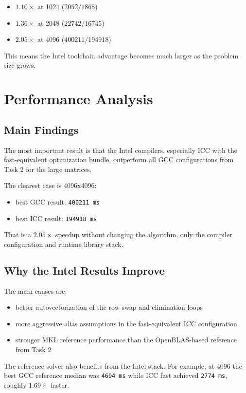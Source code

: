\documentclass[11pt,a4paper]{article}
\begin{document}
\begin{itemize}
\item $1.10\times$ at 1024 ($2052 / 1868$)
\item $1.36\times$ at 2048 ($22742 / 16745$)
\item $2.05\times$ at 4096 ($400211 / 194918$)
\end{itemize}

This means the Intel toolchain advantage becomes much larger as the problem
size grows.

\section{Performance Analysis}

\subsection{Main Findings}

The most important result is that the Intel compilers, especially ICC with the
fast-equivalent optimization bundle, outperform all GCC configurations from
Task 2 for the large matrices.

The clearest case is 4096x4096:

\begin{itemize}
\item best GCC result: \texttt{400211 ms}
\item best ICC result: \texttt{194918 ms}
\end{itemize}

That is a $2.05\times$ speedup without changing the algorithm, only the
compiler configuration and runtime library stack.

\subsection{Why the Intel Results Improve}

The main causes are:

\begin{itemize}
\item better autovectorization of the row-swap and elimination loops
\item more aggressive alias assumptions in the fast-equivalent ICC configuration
\item stronger MKL reference performance than the OpenBLAS-based reference from Task 2
\end{itemize}

The reference solver also benefits from the Intel stack. For example, at 4096
the best GCC reference median was \texttt{4694 ms} while ICC fast achieved
\texttt{2774 ms}, roughly $1.69\times$ faster.
\end{document}
